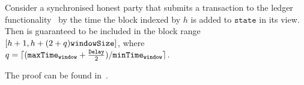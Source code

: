 \begin{proposition}
  \label{prop:liveness}
  Consider a synchronised honest party that submits a transaction \tx to the
  ledger functionality~\cite{genesis} by the time the block indexed by $h$ is
  added to $\texttt{state}$ in its view. Then \tx is guaranteed to be included
  in the block range $[h+1, h + (2 + q) \texttt{windowSize}]$, where $q = \lceil
  (\texttt{maxTime}_\texttt{window} + \frac{\texttt{Delay}}{2})/ \texttt{minTime}_\texttt{window} \rceil$.
\end{proposition}

The proof can be found in~\cite{DBLP:conf/csfw/KiayiasL20}.

